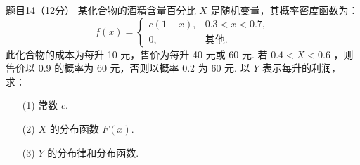 \begin{question}{题目14（12分）}
    某化合物的酒精含量百分比 $X$ 是随机变量，其概率密度函数为：
    $$
        f(x) = \begin{cases}
            c(1-x), & 0.3<x<0.7, \\
            0,      & \text{其他.}
        \end{cases}
    $$
    此化合物的成本为每升 10 元，售价为每升 40 元或 60 元. 若 $0.4<X<0.6$ ，则售价以 0.9 的概率为 60 元，否则以概率 0.2 为 60 元. 以 $Y$ 表示每升的利润，求：
    \begin{itemize}
        \item [(1)] 常数 $c$.
        \item [(2)] $X$ 的分布函数 $F(x)$.
        \item [(3)] $Y$ 的分布律和分布函数.
    \end{itemize}
\end{question}
